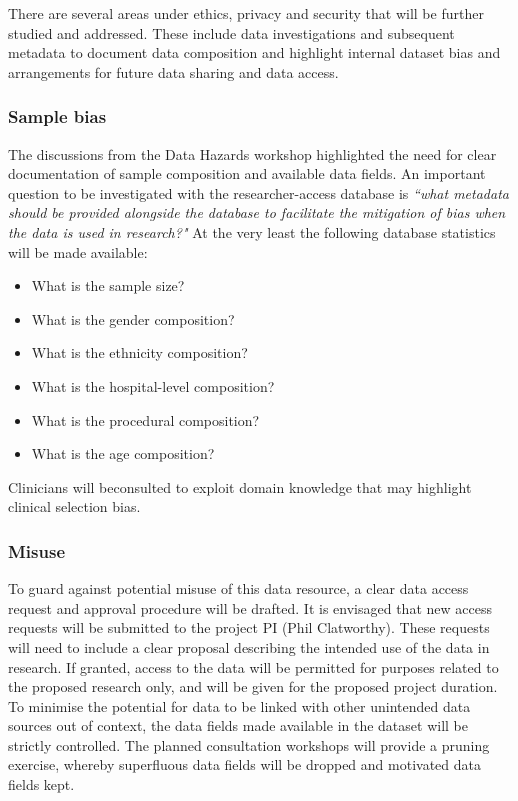 \documentclass{article}
\begin{document}
There are several areas under ethics, privacy and security that will
be further studied and addressed. These include data investigations
and subsequent metadata to document data composition and highlight
internal dataset bias and arrangements for future data sharing and data access.

\subsubsection{Sample bias}
The discussions from the Data Hazards workshop highlighted the need
for clear documentation of sample composition and available data
fields. An important question to be investigated with the
researcher-access database is \textit{``what metadata should be provided
  alongside the database to facilitate the mitigation of bias when the
  data is used in research?"} At the very least the following
database statistics will be made available:
\begin{itemize}
\item What is the sample size?
\item What is the gender composition?
\item What is the ethnicity composition?
\item What is the hospital-level composition?
\item What is the procedural composition?
\item What is the age composition?
\end{itemize}

\noindent Clinicians will beconsulted to exploit domain knowledge that may highlight clinical
selection bias.


\subsubsection{Misuse}

To guard against potential misuse of this data resource, a clear data
access request and approval procedure will be drafted. It is envisaged
that new access requests will be submitted to the project PI (Phil
Clatworthy). These requests will need to include a clear proposal
describing the intended use of the data in research. If granted, access to the
data will be permitted for purposes related to the proposed research
only, and will be given for the proposed project duration.\\

To minimise the potential for data to be linked with other unintended data
sources out of context, the data fields made available in the dataset
will be strictly controlled. The planned consultation workshops will
provide a pruning exercise, whereby superfluous data fields will be
dropped and motivated data fields kept. \\
\end{document}
